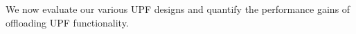 %      
% 

We now evaluate our various UPF designs and quantify the performance gains of offloading UPF functionality.

